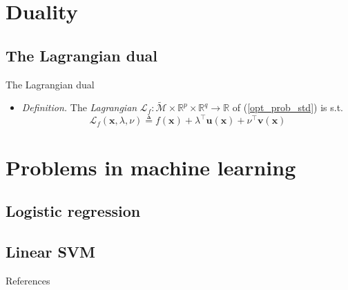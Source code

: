 \documentclass{beamer}
\numberwithin{equation}{section}
\newcommand{\aref}[1]{\alert{\ref{#1}}}
\begin{document}
\section{Duality}

\subsection{The Lagrangian dual}

\begin{frame}{The Lagrangian dual}
    \begin{itemize}
        \item
        \textit{Definition.} The \textit{Lagrangian} $ \mathcal{L}_f :
        \tilde{\mathcal{M}} \times \mathbb{R}^p \times \mathbb{R}^q \rightarrow
        \mathbb{R} $ of (\aref{opt_prob_std}) is s.t.
        \begin{equation*}
            \mathcal{L}_f(\mathbf{x}, \lambda, \nu) \triangleq f(\mathbf{x}) +
            \lambda^\top\mathbf{u}(\mathbf{x}) + \nu^\top\mathbf{v}(\mathbf{x})
        \end{equation*}
    \end{itemize}
\end{frame}

\section{Problems in machine learning}

\subsection{Logistic regression}

\subsection{Linear SVM}

\begin{frame}{References}
    
    
\end{frame}
\end{document}

